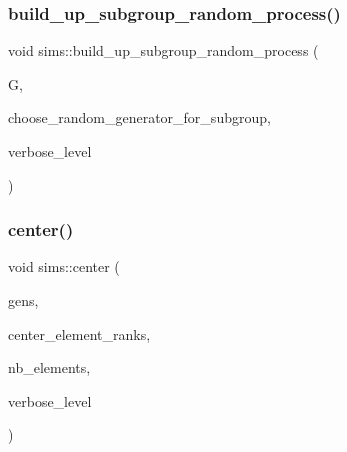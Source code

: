\mbox{\label{classsims_abd2e45239922c514c61c6ac523b72af0}} 
\subsubsection{\texorpdfstring{build\+\_\+up\+\_\+subgroup\+\_\+random\+\_\+process()}{build\_up\_subgroup\_random\_process()}}
{\footnotesize\ttfamily void sims\+::build\+\_\+up\+\_\+subgroup\+\_\+random\+\_\+process (\begin{DoxyParamCaption}\item[{\mbox{\hyperlink{classsims}{sims}} $\ast$}]{G,  }\item[{void($\ast$)(\mbox{\hyperlink{classsims}{sims}} $\ast$G, \mbox{\hyperlink{galois_8h_a09fddde158a3a20bd2dcadb609de11dc}{I\+NT}} $\ast$\mbox{\hyperlink{simeon_8_c_aec1406935bdb1fee3561fcb840964100}{Elt}}, \mbox{\hyperlink{galois_8h_a09fddde158a3a20bd2dcadb609de11dc}{I\+NT}} \mbox{\hyperlink{simeon_8_c_a818073fbcc2f439e7c56952f67386122}{verbose\+\_\+level}})}]{choose\+\_\+random\+\_\+generator\+\_\+for\+\_\+subgroup,  }\item[{\mbox{\hyperlink{galois_8h_a09fddde158a3a20bd2dcadb609de11dc}{I\+NT}}}]{verbose\+\_\+level }\end{DoxyParamCaption})}

\mbox{\label{classsims_a86c7915d8d90083fd46b4019bd6c26c3}} 
\subsubsection{\texorpdfstring{center()}{center()}}
{\footnotesize\ttfamily void sims\+::center (\begin{DoxyParamCaption}\item[{\mbox{\hyperlink{classvector__ge}{vector\+\_\+ge}} \&}]{gens,  }\item[{\mbox{\hyperlink{galois_8h_a09fddde158a3a20bd2dcadb609de11dc}{I\+NT}} $\ast$}]{center\+\_\+element\+\_\+ranks,  }\item[{\mbox{\hyperlink{galois_8h_a09fddde158a3a20bd2dcadb609de11dc}{I\+NT}} \&}]{nb\+\_\+elements,  }\item[{\mbox{\hyperlink{galois_8h_a09fddde158a3a20bd2dcadb609de11dc}{I\+NT}}}]{verbose\+\_\+level }\end{DoxyParamCaption})}

